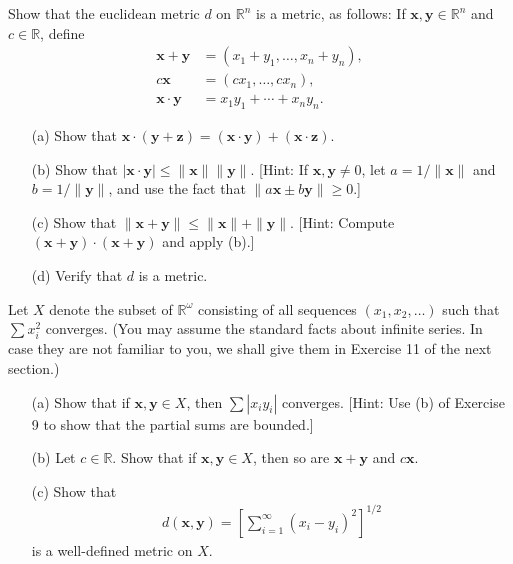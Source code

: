   \begin{exercise}[Munkres 20.9]
    Show that the euclidean metric $d$ on $\mathbb{R}^n$ is a metric, as follows: If $\mathbf{x}, \mathbf{y} \in \mathbb{R}^n$ and $c \in \mathbb{R}$, define
    \begin{align*}
      \mathbf{x} + \mathbf{y} &= (x_1 + y_1, \ldots, x_n + y_n), \\
      c\mathbf{x} &= (cx_1, \ldots, cx_n), \\
      \mathbf{x} \cdot \mathbf{y} &= x_1y_1 + \cdots + x_ny_n.
    \end{align*}
    \begin{enumerate} 
      \item[(a)] Show that $\mathbf{x} \cdot (\mathbf{y} + \mathbf{z}) = (\mathbf{x} \cdot \mathbf{y}) + (\mathbf{x} \cdot \mathbf{z})$.
      \item[(b)] Show that $|\mathbf{x}\cdot\mathbf{y}| \leq \|\mathbf{x}\|\|\mathbf{y}\|$. [Hint: If $\mathbf{x}, \mathbf{y} \neq 0$, let $a = 1/\|\mathbf{x}\|$ and $b = 1/\|\mathbf{y}\|$, and use the fact that $\|a\mathbf{x} \pm b\mathbf{y}\| \geq 0$.]
      \item[(c)] Show that $\|\mathbf{x} + \mathbf{y}\| \leq \|\mathbf{x}\| + \|\mathbf{y}\|$. [Hint: Compute $(\mathbf{x} + \mathbf{y}) \cdot (\mathbf{x} + \mathbf{y})$ and apply (b).]
      \item[(d)] Verify that $d$ is a metric.
    \end{enumerate}
  \end{exercise}

  \begin{exercise}[Munkres 20.10]
    Let $X$ denote the subset of $\mathbb{R}^\omega$ consisting of all sequences $(x_1, x_2, \ldots)$ such that $\sum x_i^2$ converges. (You may assume the standard facts about infinite series. In case they are not familiar to you, we shall give them in Exercise 11 of the next section.)
    \begin{enumerate} 
      \item[(a)] Show that if $\mathbf{x}, \mathbf{y} \in X$, then $\sum |x_i y_i|$ converges. [Hint: Use (b) of Exercise 9 to show that the partial sums are bounded.]
      \item[(b)] Let $c \in \mathbb{R}$. Show that if $\mathbf{x}, \mathbf{y} \in X$, then so are $\mathbf{x} + \mathbf{y}$ and $c\mathbf{x}$.
      \item[(c)] Show that
      \begin{align*}
        d(\mathbf{x}, \mathbf{y}) = \left[\sum_{i=1}^{\infty}(x_i - y_i)^2\right]^{1/2}
      \end{align*}
      is a well-defined metric on $X$.
    \end{enumerate}
  \end{exercise}

